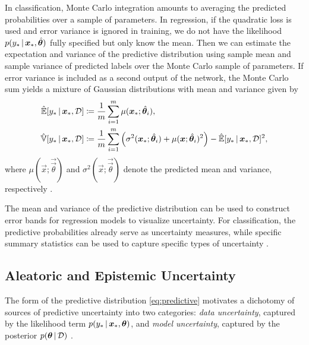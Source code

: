 In classification, Monte Carlo integration amounts to averaging the predicted probabilities over a sample of parameters. In regression, if the quadratic loss is used and error variance is ignored in training, we do not have the likelihood $p(y_* \,|\, \bm{x}_*, \hat{\bm{\bm{\theta}}})$ fully specified but only know the mean. Then we can estimate the expectation and variance of the predictive distribution using sample mean and sample variance of predicted labels over the Monte Carlo sample of parameters. If error variance is included as a second output of the network, the Monte Carlo sum yields a mixture of Gaussian distributions with mean and variance given by
\begin{align*}
  \hat{\operatorname{\mathbb{E}}}[y_* \,|\, \bm{x}_*, \mathcal{D}] &\coloneqq \frac{1}{m} \sum_{i=1}^{m} \mu(\bm{x}_*; \hat{\bm{\bm{\theta}}}_i), \\
  \hat{\operatorname{\mathbb{V}}}[y_* \,|\, \bm{x}_*, \mathcal{D}] &\coloneqq \frac{1}{m} \sum_{i=1}^{m} \left( \sigma^2(\bm{x}_*; \hat{\bm{\bm{\theta}}}_i) + \mu(\bm{x}; \hat{\bm{\bm{\theta}}}_i)^2  \right) - \hat{\operatorname{\mathbb{E}}}[y_* \,|\, \bm{x}_*, \mathcal{D}]^2,
\end{align*}
where $\mu(\vec{x}; \vec{\vec{\theta}})$ and $\sigma^2(\vec{x}; \vec{\vec{\theta}})$ denote the predicted mean and variance, respectively \citep{lakshminarayananSimpleScalablePredictive2017b}.

The mean and variance of the predictive distribution can be used to construct error bands for regression models to visualize uncertainty. For classification, the predictive probabilities already serve as uncertainty measures, while specific summary statistics can be used to capture specific types of uncertainty \citep{gawlikowskiSurveyUQ2023}.

\subsection{Aleatoric and Epistemic Uncertainty}
\label{sec:uncertainty}

The form of the predictive distribution \eqref{eq:predictive} motivates a dichotomy of sources of predictive uncertainty into two categories: \emph{data uncertainty}, captured by the likelihood term $p(y_* \,|\, \bm{x}_*, \bm{\bm{\theta}})$, and \emph{model uncertainty}, captured by the posterior $p(\bm{\bm{\theta}} \,|\, \mathcal{D})$ \citep{malininPredictiveUncertaintyEstimation2018}.

